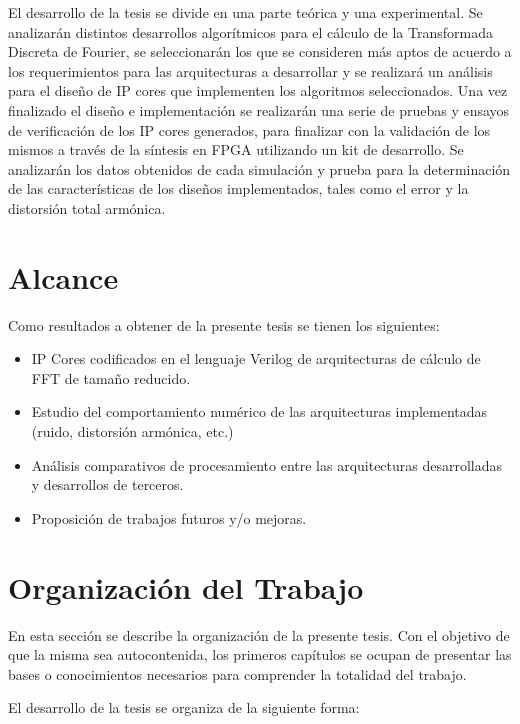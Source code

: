 El desarrollo de la tesis se divide en una parte teórica y una experimental. Se analizarán distintos
desarrollos algorítmicos para el cálculo de la Transformada Discreta de Fourier, se seleccionarán
los que se consideren más aptos de acuerdo a los requerimientos para las arquitecturas a desarrollar
y se realizará un análisis para el diseño de IP cores que implementen los algoritmos seleccionados.
Una vez finalizado el diseño e implementación se realizarán una serie de pruebas y ensayos de
verificación de los IP cores generados, para finalizar con la validación de los
mismos a través de la síntesis en FPGA utilizando un kit de desarrollo. Se analizarán los datos
obtenidos de cada simulación y prueba para la determinación de las características de los diseños
implementados, tales como el error y la distorsión total armónica.


\section{Alcance}

Como resultados a obtener de la presente tesis se tienen los siguientes:

\begin{itemize}
    \item IP Cores codificados en el lenguaje Verilog de arquitecturas de
    cálculo de FFT de tamaño reducido.
    \item Estudio del comportamiento numérico de las arquitecturas implementadas (ruido, distorsión
    armónica, etc.)
    \item Análisis comparativos de procesamiento entre las arquitecturas
    desarrolladas y desarrollos de terceros.
    \item Proposición de trabajos futuros y/o mejoras.
\end{itemize}

\section{Organización del Trabajo}
En esta sección se describe la organización de la presente tesis. Con el objetivo de que la misma sea
autocontenida, los primeros capítulos se ocupan de presentar las bases o conocimientos necesarios para comprender la
totalidad del trabajo.

El desarrollo de la tesis se organiza de la siguiente forma:

